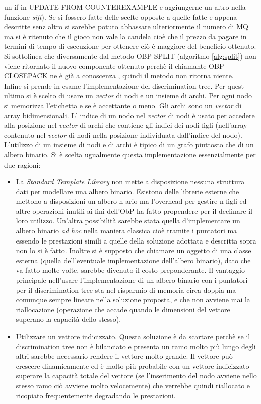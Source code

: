 un if  in UPDATE-FROM-COUNTEREXAMPLE e aggiungerne un altro nella funzione \textit{sift}). Se si fossero fatte delle scelte opposte a quelle fatte e appena descritte senz altro si sarebbe potuto abbassare ulteriormente il numero di \ac{MQ} ma si è ritenuto che il gioco non vale la candela cioè che il prezzo da pagare in termini di tempo di esecuzione per ottenere ciò è maggiore del beneficio ottenuto.\\
Si sottolinea che diversamente dal metodo OBP-SPLIT (algoritmo \ref{alg:split}) non viene ritornato il nuovo componente ottenuto perchè il chiamante OBP-CLOSEPACK ne è già a conoscenza , quindi il metodo non ritorna niente.\\
Infine si prende in esame l'implementazione del discrimination tree. Per quest ultimo si è scelto di usare un \textit{vector} di nodi e un insieme di archi. Per ogni nodo si memorizza l'etichetta e se è accettante o meno. Gli archi sono un \textit{vector} di array bidimensionali. L' indice di un nodo nel \textit{vector} di nodi è usato per accedere alla posizione nel \textit{vector} di archi che contiene gli indici dei nodi figli (nell'array contenuto nel \textit{vector} di nodi nella posizione individuata dall'indice del nodo). L'utilizzo di un insieme di nodi e di archi è tipico di un grafo piuttosto che di un albero binario. Si è scelta ugualmente questa implementazione essenzialmente per due ragioni:
\begin{itemize}
\item La \textit{Standard Template Library} non mette a disposizione nessuna struttura dati per modellare una albero binario. Esistono delle librerie esterne che mettono a disposizioni un albero n-ario ma l'overhead per gestire n figli ed altre operazioni inutili ai fini dell'\ac{ObP} ha fatto propendere per il declinare il loro utilizzo. Un'altra possibilità sarebbe stata quella d'implementare un albero binario \textit{ad hoc} nella maniera classica cioè tramite i puntatori ma essendo le prestazioni simili a quelle della soluzione adottata e descritta sopra non lo si è fatto. Inoltre si è supposto che chiamare un oggetto di una classe esterna (quella dell'eventuale implementazione dell'albero binario), dato che va fatto molte volte, sarebbe divenuto il costo preponderante. Il vantaggio principale nell'usare l'implementazione di un albero binario con i puntatori per il discrimination tree sta nel risparmio di memoria circa doppia ma comunque sempre lineare nella soluzione proposta, e che non avviene mai la riallocazione (operazione che accade quando le dimensioni del vettore superano la capacità dello stesso).
\item Utilizzare un vettore indicizzato. Questa soluzione è da scartare perchè se il discrimination tree non è bilanciato e presenta un ramo molto più lungo degli altri sarebbe necessario rendere il vettore molto grande. Il vettore può crescere dinamicamente ed è molto più probabile con un vettore indicizzato superare la capacità totale del vettore (se l'inserimento del nodo avviene nello stesso ramo ciò avviene molto velocemente) che verrebbe quindi riallocato e ricopiato frequentemente degradando le prestazioni.
\end{itemize} 
 

